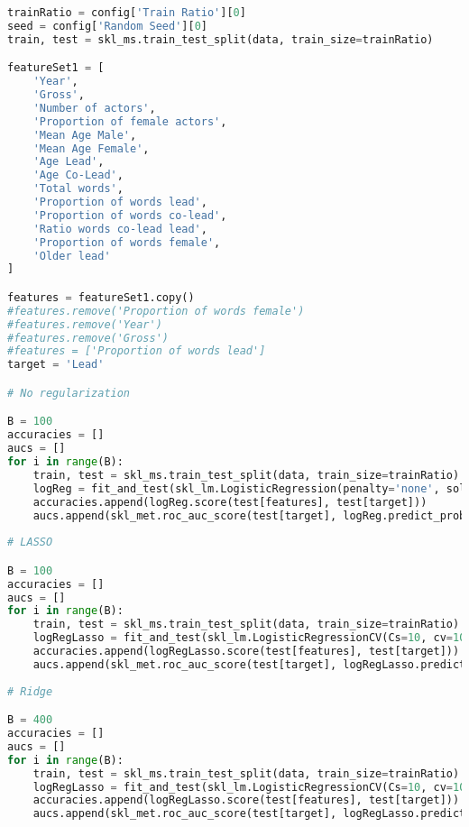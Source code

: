 \documentclass[../../project.tex]{subfiles}
\begin{document}
	\begin{lstlisting}[language=Python]
trainRatio = config['Train Ratio'][0]
seed = config['Random Seed'][0]
train, test = skl_ms.train_test_split(data, train_size=trainRatio)

featureSet1 = [
	'Year',
	'Gross',
	'Number of actors',
	'Proportion of female actors',
	'Mean Age Male',
	'Mean Age Female',
	'Age Lead',
	'Age Co-Lead',
	'Total words',
	'Proportion of words lead',
	'Proportion of words co-lead',
	'Ratio words co-lead lead',
	'Proportion of words female',
	'Older lead'
]

features = featureSet1.copy()
#features.remove('Proportion of words female')
#features.remove('Year')
#features.remove('Gross')
#features = ['Proportion of words lead']
target = 'Lead'

# No regularization

B = 100
accuracies = []
aucs = []
for i in range(B):
	train, test = skl_ms.train_test_split(data, train_size=trainRatio)
	logReg = fit_and_test(skl_lm.LogisticRegression(penalty='none', solver='newton-cg'), train, test, features, target, suppress_output=True)
	accuracies.append(logReg.score(test[features], test[target]))
	aucs.append(skl_met.roc_auc_score(test[target], logReg.predict_proba(test[features])[:,1]))
	
# LASSO

B = 100
accuracies = []
aucs = []
for i in range(B):
	train, test = skl_ms.train_test_split(data, train_size=trainRatio)
	logRegLasso = fit_and_test(skl_lm.LogisticRegressionCV(Cs=10, cv=10, penalty='l1', solver='liblinear', n_jobs=10), train, test, features, target, suppress_output=True)
	accuracies.append(logRegLasso.score(test[features], test[target]))
	aucs.append(skl_met.roc_auc_score(test[target], logRegLasso.predict_proba(test[features])[:,1]))
	
# Ridge

B = 400
accuracies = []
aucs = []
for i in range(B):
	train, test = skl_ms.train_test_split(data, train_size=trainRatio)
	logRegLasso = fit_and_test(skl_lm.LogisticRegressionCV(Cs=10, cv=10, penalty='l2', solver='liblinear', n_jobs=10), train, test, features, target, suppress_output=True)
	accuracies.append(logRegLasso.score(test[features], test[target]))
	aucs.append(skl_met.roc_auc_score(test[target], logRegLasso.predict_proba(test[features])[:,1]))
	\end{lstlisting}
\end{document}
